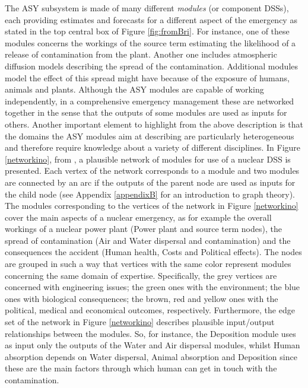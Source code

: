 The ASY subsystem is made of many different \textit{modules} (or component DSSs), each providing estimates and forecasts for a different aspect of the emergency as stated in the top central box of Figure \ref{fig:fromBri}. For instance, one of these modules concerns the workings of the source term estimating the likelihood of a release of contamination from the plant. Another one includes atmospheric diffusion models describing the spread of the contamination. Additional modules model the effect of this spread might have because of the exposure of  humans, animals and plants. Although the ASY modules are capable of working independently, in a comprehensive emergency management these are networked together in the sense that the outputs of some modules are used as inputs for others. Another important element to highlight from the above description is that the domains the ASY modules aim at describing are particularly heterogeneous and therefore require knowledge about a variety of different disciplines. In Figure \ref{networkino}, from \citet{Leonelli2013},  a plausible network of modules for use of a nuclear DSS is presented. Each vertex of the network corresponds to a module and two modules are connected by an arc if the outputs of the parent node are used as inputs for the child node (see Appendix \ref{appendixB} for an introduction to graph theory). The modules corresponding to the vertices of the network in Figure \ref{networkino} cover the main aspects of a nuclear emergency, as for example the overall workings of a nuclear power plant (Power plant and source term nodes), the spread of contamination (Air and Water dispersal and contamination) and the consequences the accident (Human health, Costs and Political effects). The nodes are grouped in such a way that vertices with the same color represent modules concerning the same domain of expertise. Specifically, the grey vertices are concerned with engineering issues; the green ones with the environment; the blue ones with biological consequences; the brown, red and yellow ones with the political, medical and economical outcomes, respectively. Furthermore, the edge set of the network in Figure \ref{networkino} describes plausible input/output relationships between the modules. So, for instance, the Deposition module uses as input only the outputs of the Water and Air dispersal modules, whilst Human absorption depends on Water dispersal, Animal absorption and Deposition since these are the main factors through which human can get in touch with the contamination. 
